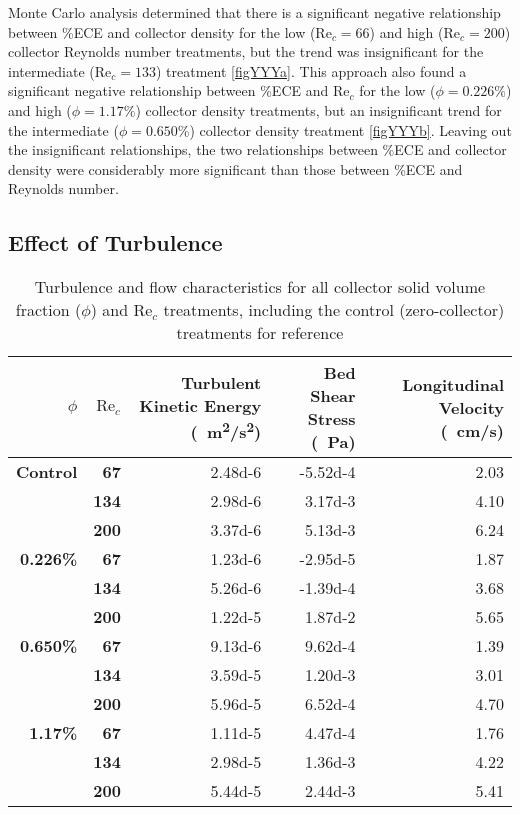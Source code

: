 \documentclass[geosciences,article,submit,moreauthors,pdftex]{Definitions/mdpi}
\newcommand\Rey{\mathrm{Re}}
\begin{document}
Monte Carlo analysis determined that there is a significant negative relationship between \%ECE and collector density for the low ($\Rey_c = 66$) and high ($\Rey_c = 200$) collector Reynolds number treatments, but the trend was insignificant for the intermediate ($\Rey_c = 133$) treatment \ref{figYYYa}. This approach also found a significant negative relationship between \%ECE and $\Rey_c$ for the low ($\phi = 0.226\%$) and high ($\phi = 1.17\%$) collector density treatments, but an insignificant trend for the intermediate ($\phi = 0.650\%$) collector density treatment \ref{figYYYb}. Leaving out the insignificant relationships, the two relationships between \%ECE and collector density were considerably more significant than those between \%ECE and Reynolds number.

\subsection{Effect of Turbulence}

\begin{table}[H]
\caption{Turbulence and flow characteristics for all collector solid volume fraction ($\phi$) and $\Rey_c$ treatments, including the control (zero-collector) treatments for reference}
\centering
\begin{tabular}{>{\bfseries}r>{\bfseries}rrrr}
\toprule
\textbf{$\phi$}&\textbf{$\Rey_c$}&\textbf{Turbulent Kinetic Energy (\SI{}{\metre^2/\second^2})}&\textbf{Bed Shear Stress (\SI{}{\pascal})}&\textbf{Longitudinal Velocity (\SI{}{\centi\metre/\second})}\\
\midrule
Control &   67  & \num{2.48d-6}&\num{-5.52d-4}&   2.03\\
        &   134 & \num{2.98d-6}&\num{ 3.17d-3}&   4.10\\
        &   200 & \num{3.37d-6}&\num{ 5.13d-3}&   6.24\\
\midrule
0.226\% &   67  & \num{1.23d-6}&\num{-2.95d-5}&   1.87\\
        &   134 & \num{5.26d-6}&\num{-1.39d-4}&   3.68\\
        &   200 & \num{1.22d-5}&\num{ 1.87d-2}&   5.65\\
\midrule
0.650\% &   67  & \num{9.13d-6}&\num{ 9.62d-4}&   1.39\\
        &   134 & \num{3.59d-5}&\num{ 1.20d-3}&   3.01\\
        &   200 & \num{5.96d-5}&\num{ 6.52d-4}&   4.70\\
\midrule
1.17\%  &   67  & \num{1.11d-5}&\num{ 4.47d-4}&   1.76\\
        &   134 & \num{2.98d-5}&\num{ 1.36d-3}&   4.22\\
        &   200 & \num{5.44d-5}&\num{ 2.44d-3}&   5.41\\
\bottomrule
\end{tabular}
\end{table}
\end{document}
